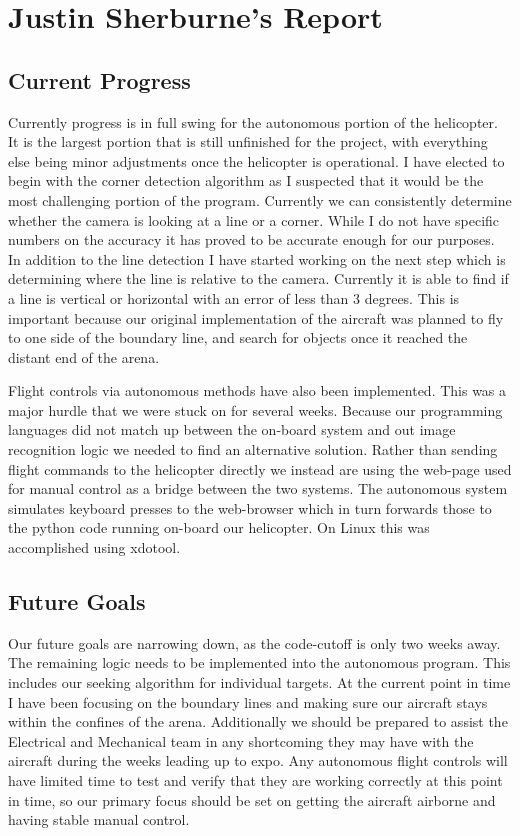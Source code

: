 \documentclass[onecolumn, draftclsnofoot,10pt, compsoc]{IEEEtran}
\begin{document}
\section{Justin Sherburne's Report}

\subsection{Current Progress}

Currently progress is in full swing for the autonomous portion of the helicopter. It is the largest portion that is still unfinished for the project, with everything else being minor adjustments once the helicopter is operational. I have elected to begin with the corner detection algorithm as I suspected that it would be the most challenging portion of the program. Currently we can consistently determine whether the camera is looking at a line or a corner. While I do not have specific numbers on the accuracy it has proved to be accurate enough for our purposes. In addition to the line detection I have started working on the next step which is determining where the line is relative to the camera. Currently it is able to find if a line is vertical or horizontal with an error of less than 3 degrees. This is important because our original implementation of the aircraft was planned to fly to one side of the boundary line, and search for objects once it reached the distant end of the arena.

Flight controls via autonomous methods have also been implemented. This was a major hurdle that we were stuck on for several weeks. Because our programming languages did not match up between the on-board system and out image recognition logic we needed to find an alternative solution. Rather than sending flight commands to the helicopter directly we instead are using the web-page used for manual control as a bridge between the two systems. The autonomous system simulates keyboard presses to the web-browser which in turn forwards those to the python code running on-board our helicopter. On Linux this was accomplished using xdotool.

\subsection{Future Goals}

Our future goals are narrowing down, as the code-cutoff is only two weeks away. The remaining logic needs to be implemented into the autonomous program. This includes our seeking algorithm for individual targets. At the current point in time I have been focusing on the boundary lines and making sure our aircraft stays within the confines of the arena. Additionally we should be prepared to assist the Electrical and Mechanical team in any shortcoming they may have with the aircraft during the weeks leading up to expo. Any autonomous flight controls will have limited time to test and verify that they are working correctly at this point in time, so our primary focus should be set on getting the aircraft airborne and having stable manual control.
\end{document}
